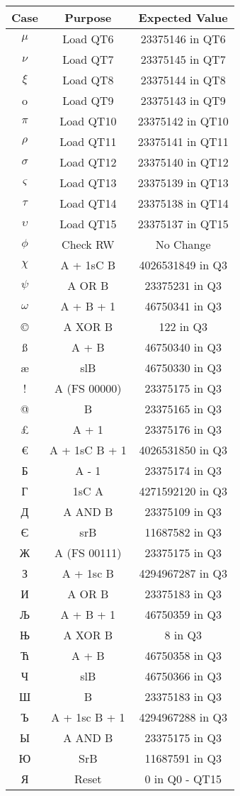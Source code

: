 \documentclass{article}
\begin{document}
\begin{tabular}{ |c|c|c| }
\hline
Case & Purpose & Expected Value \\
\hline
$\mu$ & Load QT6 & 23375146 in QT6\\
$\nu$ & Load QT7 & 23375145 in QT7\\
$\xi$ & Load QT8 & 23375144 in QT8\\
o & Load QT9 & 23375143 in QT9\\
$\pi$ & Load QT10 & 23375142 in QT10\\
$\rho$ & Load QT11 & 23375141 in QT11\\
$\sigma$ & Load QT12 & 23375140 in QT12\\
$\varsigma$ & Load QT13 & 23375139 in QT13\\
$\tau$ & Load QT14 & 23375138 in QT14\\
$\upsilon$ & Load QT15 & 23375137 in QT15\\
$\phi$ & Check RW & No Change \\
$\chi$ & A + 1sC B & 4026531849 in Q3 \\
$\psi$ & A OR B & 23375231 in Q3 \\
$\omega$ & A + B + 1 & 46750341 in Q3 \\
© & A XOR B & 122 in Q3 \\
ß & A + B & 46750340 in Q3 \\
æ & slB & 46750330 in Q3 \\
! & A (FS 00000) & 23375175 in Q3 \\
@ & B & 23375165 in Q3 \\
£ & A + 1 & 23375176 in Q3 \\
€ & A + 1sC B + 1 & 4026531850 in Q3 \\
Б & A - 1 & 23375174 in Q3 \\
Г & 1sC A & 4271592120 in Q3 \\
Д & A AND B & 23375109 in Q3 \\
Є & srB & 11687582 in Q3 \\
Ж & A (FS 00111) & 23375175 in Q3 \\
З & A + 1sc B & 4294967287 in Q3 \\
И & A OR B & 23375183 in Q3 \\
Љ & A + B + 1 & 46750359 in Q3 \\
Њ & A XOR B & 8 in Q3 \\
Ћ & A + B & 46750358 in Q3 \\
Ч & slB & 46750366 in Q3 \\
Ш & B & 23375183 in Q3 \\
Ъ & A + 1sc B + 1 & 4294967288 in Q3 \\
Ы & A AND B & 23375175 in Q3 \\
Ю & SrB & 11687591 in Q3 \\
Я & Reset & 0 in Q0 - QT15 \\
\hline
\end{tabular}
\\
\end{document}
